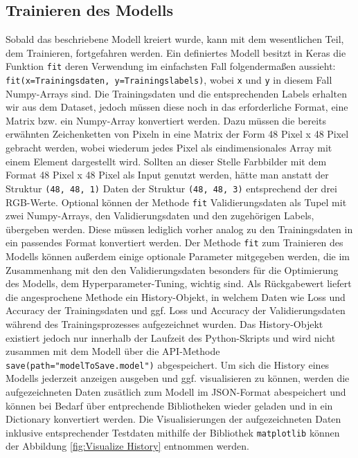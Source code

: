 \documentclass[12pt, a4paper]{report}
\begin{document}
\subsection{Trainieren des Modells}
Sobald das beschriebene Modell kreiert wurde, kann mit dem wesentlichen Teil, dem Trainieren, fortgefahren werden. Ein definiertes Modell besitzt in Keras die Funktion \texttt{fit} deren Verwendung im einfachsten Fall folgendermaßen aussieht: \texttt{fit(x=Trainingsdaten, y=Trainingslabels)}, wobei \texttt{x} und \texttt{y} in diesem Fall Numpy-Arrays sind. Die Trainingsdaten und die entsprechenden Labels erhalten wir aus dem Dataset, jedoch müssen diese noch in das erforderliche Format, eine Matrix bzw. ein Numpy-Array konvertiert werden. Dazu müssen die bereits erwähnten Zeichenketten von Pixeln in eine Matrix der Form 48 Pixel x 48 Pixel gebracht werden, wobei wiederum jedes Pixel als eindimensionales Array mit einem Element dargestellt wird. Sollten an dieser Stelle Farbbilder mit dem Format 48 Pixel x 48 Pixel als Input genutzt werden, hätte man anstatt der Struktur \texttt{(48, 48, 1)} Daten der Struktur \texttt{(48, 48, 3)} entsprechend der drei RGB-Werte. Optional können der Methode \texttt{fit} Validierungsdaten als Tupel mit zwei Numpy-Arrays, den Validierungsdaten und den zugehörigen Labels, übergeben werden. Diese müssen lediglich vorher analog zu den Trainingsdaten in ein passendes Format konvertiert werden.
Der Methode \texttt{fit} zum Trainieren des Modells können außerdem einige optionale Parameter mitgegeben werden, die im Zusammenhang mit den den Validierungsdaten besonders für die Optimierung des Modells, dem Hyperparameter-Tuning, wichtig sind.\newline
Als Rückgabewert liefert die angesprochene Methode ein History-Objekt, in welchem Daten wie Loss und Accuracy der Trainingsdaten und ggf. Loss und Accuracy der Validierungsdaten während des Trainingsprozesses aufgezeichnet wurden. Das History-Objekt existiert jedoch nur innerhalb der Laufzeit des Python-Skripts und wird nicht zusammen mit dem Modell über die API-Methode \texttt{save(path="modelToSave.model")} abgespeichert. Um sich die History eines Modells jederzeit anzeigen ausgeben und ggf. visualisieren zu können, werden die aufgezeichneten Daten zusätlich zum Modell im JSON-Format abespeichert und können bei Bedarf über entprechende Bibliotheken wieder geladen und in ein Dictionary konvertiert werden.\newline
Die Visualisierungen der aufgezeichneten Daten inklusive entsprechender Testdaten mithilfe der Bibliothek \texttt{matplotlib} können der Abbildung \ref{fig:Visualize History} entnommen werden.
\end{document}
